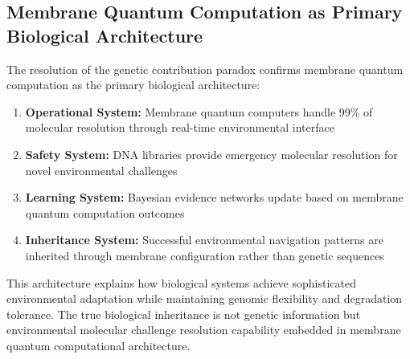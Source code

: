 \documentclass[12pt,a4paper]{article}
\begin{document}
\subsection{Membrane Quantum Computation as Primary Biological Architecture}

The resolution of the genetic contribution paradox confirms membrane quantum computation as the primary biological architecture:

\begin{enumerate}
\item \textbf{Operational System:} Membrane quantum computers handle 99\% of molecular resolution through real-time environmental interface
\item \textbf{Safety System:} DNA libraries provide emergency molecular resolution for novel environmental challenges
\item \textbf{Learning System:} Bayesian evidence networks update based on membrane quantum computation outcomes
\item \textbf{Inheritance System:} Successful environmental navigation patterns are inherited through membrane configuration rather than genetic sequences
\end{enumerate}

This architecture explains how biological systems achieve sophisticated environmental adaptation while maintaining genomic flexibility and degradation tolerance. The true biological inheritance is not genetic information but environmental molecular challenge resolution capability embedded in membrane quantum computational architecture.
\end{document}
